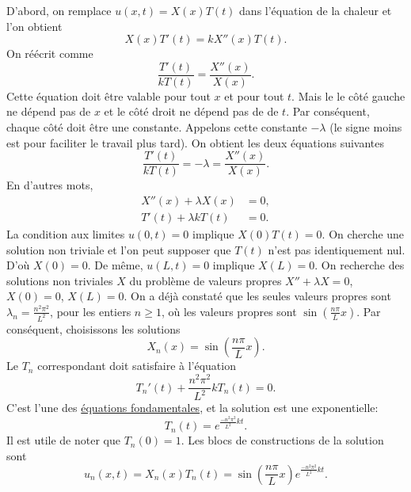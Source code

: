 D'abord, on remplace $u(x, t) = X(x)T(t)$ dans l'équation de la chaleur et l'on obtient
\begin{equation*}
X(x)T'(t) = k X''(x)T(t) .
\end{equation*}
On réécrit comme
\begin{equation*}
\frac{T'(t)}{k T(t)} =
\frac{X''(x)}{X(x)} .
\end{equation*}
Cette équation doit être valable pour tout $ x $ et pour tout $ t $.  Mais le
le côté gauche ne dépend pas de $ x $ et le côté droit ne dépend pas de
de $ t $.  Par conséquent,  chaque côté doit être une constante.  Appelons cette
constante $-\lambda$ (le signe moins est pour faciliter le travail plus tard).
On obtient les deux équations suivantes
\begin{equation*}
\frac{T'(t)}{k T(t)} = -\lambda =
\frac{X''(x)}{X(x)} .
\end{equation*}
En d'autres mots,
\begin{align*}
X''(x) + \lambda X(x) &= 0 , \\
T'(t) + \lambda k T(t) &= 0 .
\end{align*}
La condition aux limites $ u (0, t) = 0 $ implique $ X (0) T (t) = 0 $.  On cherche
une solution non triviale et l'on peut supposer que $ T (t) $ n'est pas identiquement nul.  D'où $ X (0) = 0 $.  De même, $ u (L, t) = 0 $ implique $ X (L) = 0 $.  On
recherche des solutions non triviales $ X $ du problème de valeurs propres
$X'' + \lambda X = 0$, $X(0) = 0$, $X(L) = 0$.  
On a déjà constaté que les seules valeurs propres sont $\lambda_n = \frac{n^2 \pi^2}{L^2}$,  pour les entiers 
$n \geq 1$,
où les valeurs propres sont $\sin \left(\frac{n \pi}{L} x\right)$.  Par conséquent, choisissons
les solutions
\begin{equation*}
X_n (x) = \sin \left(\frac{n \pi}{L} x \right) .
\end{equation*}
Le $ T_n $ correspondant doit satisfaire à l'équation
\begin{equation*}
T_n'(t) + \frac{n^2 \pi^2}{L^2} k T_n(t) = 0 .
\end{equation*}
C'est l'une des
\hyperref[subsection:fourfundamental]{équations fondamentales},
et la solution est une exponentielle:
\begin{equation*}
T_n(t) = e^{\frac{-n^2 \pi^2}{L^2} k t} .
\end{equation*}
Il est utile de noter que $T_n(0) = 1$.
Les blocs de constructions de la solution sont
\begin{equation*}
u_n(x,t) = X_n(x)T_n(t) =
\sin \left( \frac{n \pi}{L} x \right)
e^{\frac{-n^2 \pi^2}{L^2} k t} .
\end{equation*}

